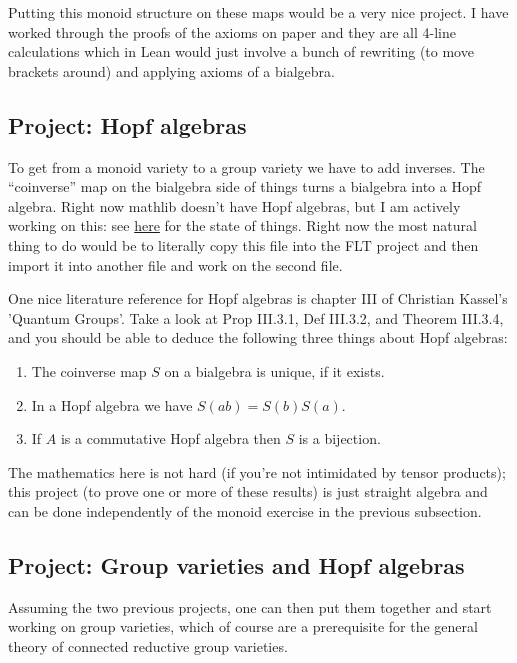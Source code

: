 \documentclass{amsart}
\begin{document}
Putting this monoid structure on these maps would be a very nice project. I have worked through the proofs of the axioms on paper and they are all 4-line calculations which in Lean would just involve a bunch of rewriting (to move brackets around) and applying axioms of a bialgebra.

\subsection{Project: Hopf algebras}

To get from a monoid variety to a group variety we have to add inverses. The ``coinverse'' map on the bialgebra side of things turns a bialgebra into a Hopf algebra. Right now mathlib doesn't have Hopf algebras, but I am actively working on this: see \href{https://github.com/leanprover-community/mathlib4/pull/10079}{here} for the state of things. Right now the most natural thing to do would be to literally copy this file into the FLT project and then import it into another file and work on the second file.

One nice literature reference for Hopf algebras is chapter III of Christian Kassel's 'Quantum Groups'. Take a look at Prop III.3.1, Def III.3.2, and Theorem III.3.4, and you should be able to deduce the following three things about Hopf algebras:

\begin{enumerate}
\item The coinverse map $S$ on a bialgebra is unique, if it exists.
\item In a Hopf algebra we have $S(ab)=S(b)S(a)$.
\item If $A$ is a commutative Hopf algebra then $S$ is a bijection.
\end{enumerate}

The mathematics here is not hard (if you're not intimidated by tensor products); this project (to prove one or more of these results) is just straight algebra and can be done independently of the monoid exercise in the previous subsection.

\subsection{Project: Group varieties and Hopf algebras}

Assuming the two previous projects, one can then put them together and start working on group varieties, which of course are a prerequisite for the general theory of connected reductive group varieties.
\end{document}
